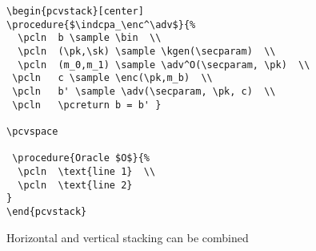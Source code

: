 \documentclass[a4paper]{report}
\begin{document}
\begin{lstlisting}
\begin{pcvstack}[center]
\procedure{$\indcpa_\enc^\adv$}{%
  \pcln  b \sample \bin  \\
  \pcln  (\pk,\sk) \sample \kgen(\secparam)  \\
  \pcln  (m_0,m_1) \sample \adv^O(\secparam, \pk)  \\
 \pcln   c \sample \enc(\pk,m_b)  \\
 \pcln   b' \sample \adv(\secparam, \pk, c)  \\
 \pcln   \pcreturn b = b' }

\pcvspace

 \procedure{Oracle $O$}{%
  \pcln  \text{line 1}  \\
  \pcln  \text{line 2}
}
\end{pcvstack}
\end{lstlisting}


Horizontal and vertical stacking can be combined
\begin{pchstack}[center]

\begin{pcvstack}%

\pcvspace

\begin{pchstack}


\end{pchstack}
\end{pcvstack}

\pchspace


\end{pchstack}
\end{document}
